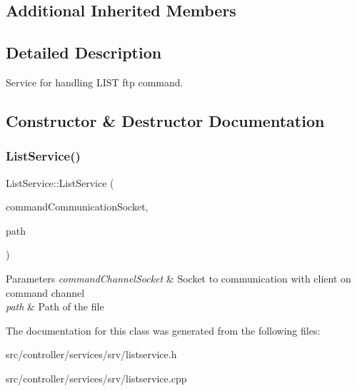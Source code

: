 \subsection*{Additional Inherited Members}


\subsection{Detailed Description}
Service for handling L\+I\+ST ftp command. 

\subsection{Constructor \& Destructor Documentation}
\mbox{\label{classListService_ae7007649faedef397ea6cc4896675e97}} 
\subsubsection{\texorpdfstring{List\+Service()}{ListService()}}
{\footnotesize\ttfamily List\+Service\+::\+List\+Service (\begin{DoxyParamCaption}\item[{int}]{command\+Communication\+Socket,  }\item[{const Q\+String \&}]{path }\end{DoxyParamCaption})}


\begin{DoxyParams}{Parameters}
{\em command\+Channel\+Socket} & Socket to communication with client on command channel \\
\hline
{\em path} & Path of the file \\
\hline
\end{DoxyParams}


The documentation for this class was generated from the following files\+:\begin{DoxyCompactItemize}
\item 
src/controller/services/srv/listservice.\+h\item 
src/controller/services/srv/listservice.\+cpp\end{DoxyCompactItemize}
